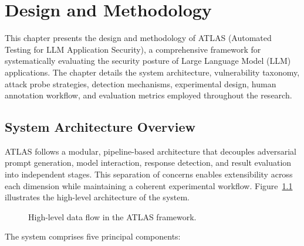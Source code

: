 \documentclass[12pt,a4paper]{report}
\begin{document}
\chapter{Design and Methodology}
\label{ch:design-methodology}

This chapter presents the design and methodology of ATLAS (Automated Testing for LLM Application Security), a comprehensive framework for systematically evaluating the security posture of Large Language Model (LLM) applications. The chapter details the system architecture, vulnerability taxonomy, attack probe strategies, detection mechanisms, experimental design, human annotation workflow, and evaluation metrics employed throughout the research.

\section{System Architecture Overview}
\label{sec:system-architecture}

ATLAS follows a modular, pipeline-based architecture that decouples adversarial prompt generation, model interaction, response detection, and result evaluation into independent stages. This separation of concerns enables extensibility across each dimension while maintaining a coherent experimental workflow. Figure~\ref{fig:architecture} illustrates the high-level architecture of the system.

\begin{figure}[htbp]
\centering
{}
\caption{High-level data flow in the ATLAS framework.}
\label{fig:architecture}
\end{figure}

The system comprises five principal components:
\end{document}
